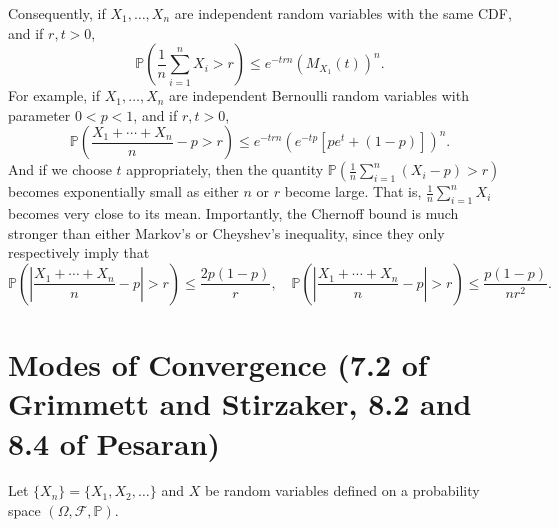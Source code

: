 \begin{remark}Consequently, if $X_{1},\ldots,X_{n}$ are independent random variables with the same CDF, and if $r,t>0$,
$$\mathbb{P}\left(\frac{1}{n}\sum_{i=1}^{n}X_{i}>r\right)\leq e^{-trn}(M_{X_{1}}(t))^{n}.$$
For example, if $X_{1},\ldots,X_{n}$ are independent Bernoulli random variables with parameter $0<p<1$,  and if $r,t>0$,
$$\mathbb{P}\left(\frac{X_{1}+\cdots+X_{n}}{n}-p>r\right)\leq e^{-trn}( e^{-tp}[pe^{t}+(1-p)])^{n}.$$
And if we choose $t$ appropriately, then the quantity $\mathbb{P}\left(\frac{1}{n}\sum_{i=1}^{n}(X_{i}-p)>r\right)$ becomes exponentially small as either $n$ or $r$ become large.  That is, $\frac{1}{n}\sum_{i=1}^{n}X_{i}$ becomes very close to its mean.  Importantly, the Chernoff bound is much stronger than either Markov's or Cheyshev's inequality, since they only respectively imply that
$$\mathbb{P}\left( \left|\frac{X_{1}+\cdots+X_{n}}{n}-p \right|>r\right)\leq \frac{2p(1-p)}{r},   %
\quad\mathbb{P}\left(\left|\frac{X_{1}+\cdots+X_{n}}{n}-p \right|>r\right)\leq \frac{p(1-p)}{nr^{2}}.$$ %
\end{remark}



\section{Modes of Convergence (7.2 of Grimmett and Stirzaker, 8.2 and 8.4 of Pesaran)}

 Let \(\{X_n\} = \{X_1, X_2, \ldots\}\) and \(X\) be random variables defined on a probability space \((\Omega, \mathcal{F}, \mathbb{P})\).

